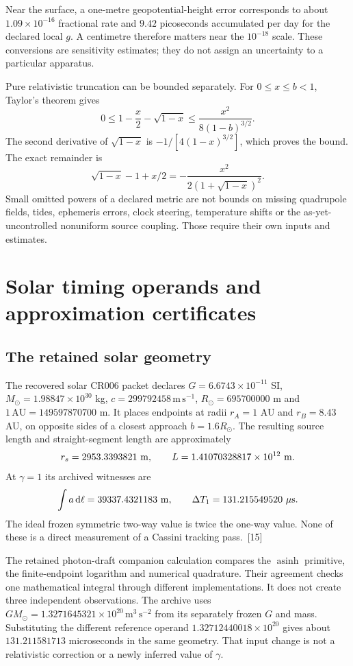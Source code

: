\documentclass[10pt,twocolumn,letterpaper]{article}
\newcommand{\dd}{\mathrm{d}}
\begin{document}
Near the surface, a one-metre geopotential-height error corresponds to about $1.09\times 10^{-16}$ fractional rate and $9.42$ picoseconds accumulated per day for the declared local $g$. A centimetre therefore matters near the $10^{-18}$ scale. These conversions are sensitivity estimates; they do not assign an uncertainty to a particular apparatus.

Pure relativistic truncation can be bounded separately. For $0\le x\le b<1$, Taylor's theorem gives
\[
 0\le 1-\frac{x}{2}-\sqrt{1-x}
 \le\frac{x^2}{8(1-b)^{3/2}}.
\]
The second derivative of $\sqrt{1-x}$ is $-1/[4(1-x)^{3/2}]$, which proves the bound. The exact remainder is
\[
 \sqrt{1-x}-1+x/2=-\frac{x^2}{2(1+\sqrt{1-x})^2}.
\]
Small omitted powers of a declared metric are not bounds on missing quadrupole fields, tides, ephemeris errors, clock steering, temperature shifts or the as-yet-uncontrolled nonuniform source coupling. Those require their own inputs and estimates.


\section{Solar timing operands and approximation certificates}\label{app:solar}


\subsection{The retained solar geometry}
The recovered solar CR006 packet declares $G=6.6743\times 10^{-11}$ SI, $M_\odot=1.98847\times 10^{30}$ kg, $c=299792458\,\mathrm{m\,s^{-1}}$, $R_\odot=695700000$ m and $1\,\mathrm{AU}=149597870700$ m. It places endpoints at radii $r_A=1$ AU and $r_B=8.43$ AU, on opposite sides of a closest approach $b=1.6R_\odot$. The resulting source length and straight-segment length are approximately
\[
 r_s=2953.3393821\ {\rm m},\qquad
 L=1.41070328817\times 10^{12}\ {\rm m}.
\]
At $\gamma=1$ its archived witnesses are
\[
 \int a\,\dd\ell=39337.4321183\ {\rm m},\qquad
 \Delta T_1=131.215549520\ \mu{\rm s}.
\]
The ideal frozen symmetric two-way value is twice the one-way value. None of these is a direct measurement of a Cassini tracking pass.~[15]

The retained photon-draft companion calculation compares the $\operatorname{asinh}$ primitive, the finite-endpoint logarithm and numerical quadrature. Their agreement checks one mathematical integral through different implementations. It does not create three independent observations. The archive uses $GM_\odot=1.3271645321\times 10^{20}\,\mathrm{m^3\,s^{-2}}$ from its separately frozen $G$ and mass. Substituting the different reference operand $1.32712440018\times 10^{20}$ gives about $131.211581713$ microseconds in the same geometry. That input change is not a relativistic correction or a newly inferred value of $\gamma$.
\end{document}
